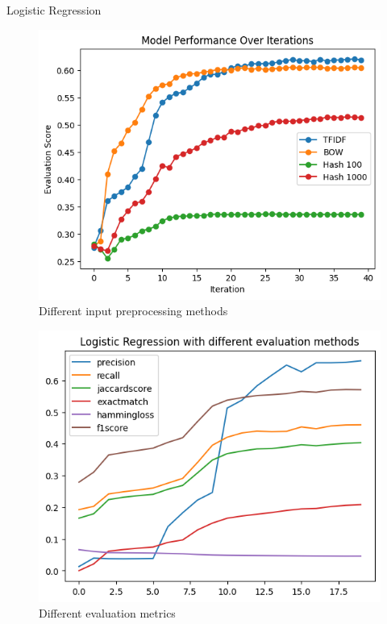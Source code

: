 \documentclass{beamer}
\begin{document}
\begin{frame}[t]{Logistic Regression}
 {
	\vspace{-3mm}
	\begin{figure}[h]
		\caption{Different input preprocessing methods}
		\centering
		\includegraphics[width=0.73\linewidth]{images/LogisticRegression/f1score_compare_inprep.png}
	\end{figure}
}

\pause
{} {
	\vspace{-3mm}
	\begin{figure}[h]
		\caption{Different evaluation metrics}
		\centering
		\includegraphics[width=0.73\linewidth]{images/LogisticRegression/compare_evaluations.png}
	\end{figure}
}


\end{frame}
\end{document}
